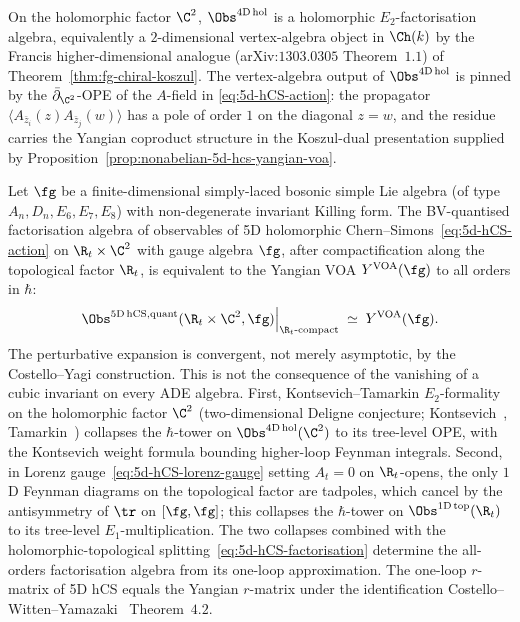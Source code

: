 On the holomorphic factor $\C^2$, $\Obs^{\mathrm{4D\,hol}}$ is a
holomorphic $E_2$-factorisation algebra, equivalently a
$2$-dimensional vertex-algebra object in $\Ch(k)$ by the Francis
higher-dimensional analogue (arXiv:$1303.0305$ Theorem~$1.1$) of
Theorem~\ref{thm:fg-chiral-koszul}. The vertex-algebra output of
$\Obs^{\mathrm{4D\,hol}}$ is pinned by the $\bar\partial_{\C^2}$-OPE
of the $A$-field in \eqref{eq:5d-hCS-action}: the propagator
$\langle A_{\bar z_i}(z) A_{\bar z_j}(w)\rangle$ has a pole of order
$1$ on the diagonal $z = w$, and the residue carries the Yangian
coproduct structure in the Koszul-dual presentation supplied by
Proposition~\ref{prop:nonabelian-5d-hcs-yangian-voa}.

\begin{proposition}
\label{prop:nonabelian-5d-hcs-yangian-voa}
\ClaimStatusProvedElsewhere
Let $\fg$ be a finite-dimensional simply-laced bosonic simple Lie
algebra (of type $A_n, D_n, E_6, E_7, E_8$) with non-degenerate
invariant Killing form. The BV-quantised factorisation algebra of
observables of 5D holomorphic Chern--Simons~\eqref{eq:5d-hCS-action}
on $\R_t \times \C^2$ with gauge algebra $\fg$, after compactification
along the topological factor $\R_t$, is equivalent to the Yangian VOA
$Y^{\mathrm{VOA}}(\fg)$ to all orders in $\hbar$:
\begin{equation}
\label{eq:5d-hcs-yangian-voa-allorders}
 \Obs^{\mathrm{5D\,hCS}, \mathrm{quant}}(\R_t \times \C^2, \fg)
 \Big|_{\R_t\text{-compact}}
 \;\simeq\;
 Y^{\mathrm{VOA}}(\fg).
\end{equation}
The perturbative expansion is convergent, not merely asymptotic, by
the Costello--Yagi construction. This is not the consequence of the
vanishing of a cubic invariant on every ADE algebra. First,
Kontsevich--Tamarkin $E_2$-formality on the
holomorphic factor $\C^2$ (two-dimensional Deligne conjecture;
Kontsevich~\cite{Kontsevich1999}, Tamarkin~\cite{Tamarkin2007}) collapses
the $\hbar$-tower on $\Obs^{\mathrm{4D\,hol}}(\C^2)$ to its tree-level
OPE, with the Kontsevich weight formula bounding higher-loop Feynman
integrals. Second, in Lorenz gauge~\eqref{eq:5d-hCS-lorenz-gauge}
setting $A_t = 0$ on $\R_t$-opens, the only $1$D Feynman diagrams on
the topological factor are tadpoles, which cancel by the antisymmetry
of $\tr$ on $[\fg, \fg]$; this collapses the $\hbar$-tower on
$\Obs^{\mathrm{1D\,top}}(\R_t)$ to its tree-level $E_1$-multiplication.
The two collapses combined with the holomorphic-topological
splitting~\eqref{eq:5d-hCS-factorisation} determine the all-orders
factorisation algebra from its one-loop approximation. The one-loop
$r$-matrix of 5D hCS equals the Yangian $r$-matrix under the
identification Costello--Witten--Yamazaki~\cite{CostelloWittenYamazaki}
Theorem~$4.2$.


\end{proposition}
